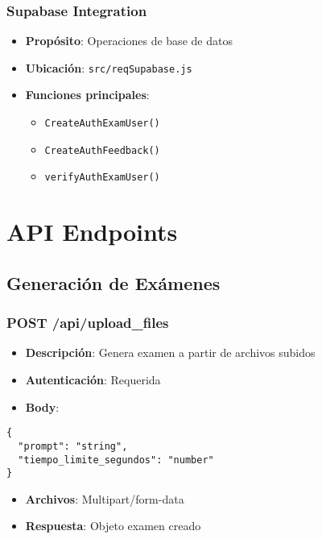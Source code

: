 \documentclass[12pt,a4paper]{report}
\begin{document}
\subsection{Supabase Integration}
\begin{itemize}
    \item \textbf{Propósito}: Operaciones de base de datos
    \item \textbf{Ubicación}: \texttt{src/reqSupabase.js}
    \item \textbf{Funciones principales}:
    \begin{itemize}
        \item \texttt{CreateAuthExamUser()}
        \item \texttt{CreateAuthFeedback()}
        \item \texttt{verifyAuthExamUser()}
    \end{itemize}
\end{itemize}

\chapter{API Endpoints}

\section{Generación de Exámenes}

\subsection{POST /api/upload\_files}
\begin{itemize}
    \item \textbf{Descripción}: Genera examen a partir de archivos subidos
    \item \textbf{Autenticación}: Requerida
    \item \textbf{Body}:
\end{itemize}

\begin{lstlisting}
{
  "prompt": "string",
  "tiempo_limite_segundos": "number"
}
\end{lstlisting}

\begin{itemize}
    \item \textbf{Archivos}: Multipart/form-data
    \item \textbf{Respuesta}: Objeto examen creado
\end{itemize}
\end{document}
